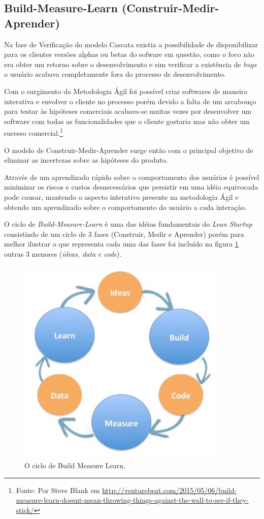 \subsection{Build-Measure-Learn (Construir-Medir-Aprender)}
\par Na fase de Verificação do modelo Cascata existia a possibilidade de disponibilizar para os clientes versões alphas ou betas do sofware em questão, como o foco não era obter um retorno sobre o desenvolvimento e sim verificar a existência de \emph{bugs} o usuário acabava completamente fora do processo de desenvolvimento.
\par Com o surgimento da Metodologia Ágil foi possível criar softwares de maneira interativa e envolver o cliente no processo porém devido a falta de um arcabouço para testar às hipóteses comerciais acabava-se muitas vezes por desenvolver um software com todas as funcionalidades que o cliente gostaria mas não obter um sucesso comercial.\footnote{Fonte: Por Steve Blank em \url{http://venturebeat.com/2015/05/06/build-measure-learn-doesnt-mean-throwing-things-against-the-wall-to-see-if-they-stick/}}
\par O modelo de Construir-Medir-Aprender surge então com o principal objetivo de eliminar as incertezas sobre as hipóteses do produto.
\par  Através de um aprendizado rápido sobre o comportamento dos usuários é possível  minimizar os riscos  e custos desnecessários que persistir em uma idéia equivocada pode causar, mantendo o aspecto interativo presente na metodologia Ágil e obtendo um aprendizado sobre o comportamento do usuário a cada interação.
\par O ciclo de \emph{Build-Measure-Learn} é uma das idéias fundamentais do \emph{Lean Startup} consistindo de um ciclo de 3 fases (Construir, Medir e Aprender) porém para melhor ilustrar o que representa cada uma das fases foi incluído na figura \ref{fig:buildmeasurelearn} outras 3 menores (\emph{ideas, data e code}).
\begin{figure}[htb]
\centering
\includegraphics[width=10cm]{figuras/buildmeasurelearn}
\caption{\label{fig:buildmeasurelearn}O ciclo de Build Measure Learn.}
\end{figure}
